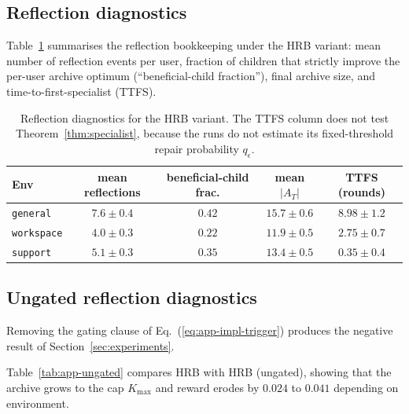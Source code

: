 \documentclass{article} %
\renewcommand{\eqref}[1]{\textup{(\ref{#1})}}
\begin{document}
\subsection{Reflection diagnostics}

\label{app:tab-refl}

Table~\ref{tab:app-reflection} summarises the reflection bookkeeping under the \textnormal{HRB} variant: mean number of reflection events per user, fraction of children that strictly improve the per-user archive optimum (``beneficial-child fraction''), final archive size, and time-to-first-specialist (TTFS).

\begin{table}[h]
\centering
\small
\caption{Reflection diagnostics for the \textnormal{HRB} variant. The TTFS column
does not test Theorem~\ref{thm:specialist}, because the runs do not estimate its
fixed-threshold repair probability \(q_\epsilon\).}
\label{tab:app-reflection}
\begin{tabular}{lcccc}
\toprule
Env & mean reflections & beneficial-child frac. & mean $|A_T|$ & TTFS (rounds) \\
\midrule
\texttt{general}   & $7.6 \pm 0.4$ & $0.42$ & $15.7 \pm 0.6$ & $8.98 \pm 1.2$ \\
\texttt{workspace} & $4.0 \pm 0.3$ & $0.22$ & $11.9 \pm 0.5$ & $2.75 \pm 0.7$ \\
\texttt{support}   & $5.1 \pm 0.3$ & $0.35$ & $13.4 \pm 0.5$ & $0.35 \pm 0.4$ \\
\bottomrule
\end{tabular}

\end{table}

\subsection{Ungated reflection diagnostics}

\label{app:tab-ungated}

Removing the gating clause of Eq.~\eqref{eq:app-impl-trigger} produces the
negative result of Section~\ref{sec:experiments}.

Table~\ref{tab:app-ungated} compares HRB with HRB (ungated), showing that the archive grows to the cap $K_{\max}$ and reward erodes by $0.024$ to $0.041$ depending on environment.
\end{document}
